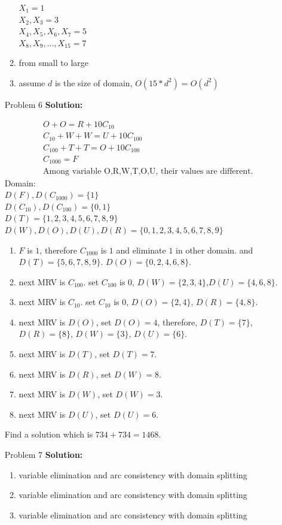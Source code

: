 \normalfont\documentclass[letterpaper,11pt]{article}
\begin{document}
\begin{enumerate}
\begin{enumerate}
		$X_1 = 1$ \\
		$X_2,X_3 = 3$ \\
		$X_4,X_5,X_6,X_7 = 5$ \\
		$X_8,X_9,...,X_{15} = 7$
		\item from small to large
		\item assume $d$ is the size of domain, $O(15 * d^2) = O(d^2)$
	\end{enumerate}
\item[Problem 6]\textbf{Solution:}\par
	\begin{gather*}
		O + O = R + 10C_{10}\\
		C_{10} + W + W = U + 10 C_{100}\\
		C_{100} + T + T = O + 10 C_{100}\\
		C_{1000} = F\\
		\text{Among variable O,R,W,T,O,U, their values are different.}
	\end{gather*}
	Domain:\\
	$D(F),D(C_{1000}) = \{1\}$ \\
	$D(C_{10}),D(C_{100}) = \{0,1\}$ \\
	$D(T) = \{1,2,3,4,5,6,7,8,9\}$ \\
	$D(W),D(O),D(U),D(R) = \{0,1,2,3,4,5,6,7,8,9\}$
	\begin{enumerate}
		\item $F$ is $1$, therefore $C_{1000}$ is $1$ and eliminate $1$ in other domain. and $D(T) = \{5,6,7,8,9\}$. $D(O) = \{0,2,4,6,8\}$.
		\item next MRV is $C_{100}$. set $C_{100}$ is $0$, $D(W) = \{2,3,4\}$,$D(U) = \{4,6,8\}$.
		\item next MRV is $C_{10}$. set $C_{10}$ is $0$, $D(O) = \{2,4\}$, $D(R) = \{4,8\}$.
		\item next MRV is $D(O)$, set $D(O)= 4$, therefore, $D(T) = \{7\}$,$D(R) = \{8\}$, $D(W) = \{3\}$, $D(U) = \{6\}$.
		\item next MRV is $D(T)$, set  $D(T) = 7$.
		\item next MRV is $D(R)$, set  $D(W) = 8$.
		\item next MRV is $D(W)$, set  $D(W) = 3$.
		\item next MRV is $D(U)$, set  $D(U) = 6$.
	\end{enumerate}
	Find a solution which is $734 + 734 = 1468$.
\item[Problem 7]\textbf{Solution:}\par
	\begin{enumerate}
		\item variable elimination and arc consistency with domain splitting
		\item variable elimination and arc consistency with domain splitting
		\item variable elimination and arc consistency with domain splitting
	\end{enumerate}


\end{enumerate}
\end{document}
